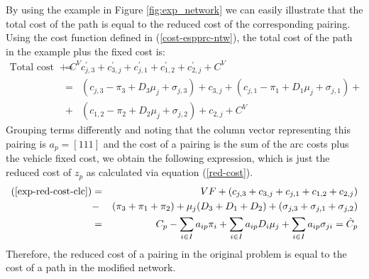 By using the example in Figure \ref{fig:exp_network} we can easily illustrate
that the total cost of the path is equal to the reduced cost of the corresponding pairing.
Using the cost function defined in (\ref{cost-espprc-ntw}), the total cost
of the path in the example plus the fixed cost is:
\begin{eqnarray}
\mbox{Total cost of the path} + C^V & = & c^{'}_{j,3}+c^{'}_{3,j}+c^{'}_{j,1}+c^{'}_{1,2}+c^{'}_{2,j} + C^V \nonumber\\
                              & = & (c_{j,3}-\pi_3+D_3\mu_j+\sigma_{j,3})+ c_{3,j} + (c_{j,1}-\pi_1+D_1\mu_j+\sigma_{j,1}) + \nonumber\\
                              & + & (c_{1, 2}-\pi_2+D_2\mu_j+\sigma_{j,2}) + c_{2,j} + C^V \label{exp-red-cost-clc}
\end{eqnarray} 
Grouping terms differently and noting that the column vector representing this pairing is 
$a_{p}=[1 1 1]$ and the cost of a pairing is the sum of the arc costs plus the vehicle 
fixed cost, we obtain the following expression, which is just the reduced cost of $z_{p}$ as calculated
via equation (\ref{red-cost}).
\begin{eqnarray*}
(\ref{exp-red-cost-clc})  & = & VF + (c_{j,3}+c_{3,j}+ c_{j,1}+ c_{1,2} + c_{2,j}) \\
                & - & (\pi_3+\pi_1+\pi_2)+ \mu_j (D_3+D_1+D_2)  +  (\sigma_{j,3}+\sigma_{j,1}+\sigma_{j,2})\\
             &=& C_{p}-\sum_{i\in I}a_{ip} \pi_{i}+\sum_{i \in I}a_{ip} D_{i}\mu_{j}+\sum_{i \in I}a_{ip}\sigma_{ji} = \hat{C}_{p}
\end{eqnarray*} 
Therefore, the reduced cost of a pairing in the original problem is equal to the cost
of a path in the modified network.


